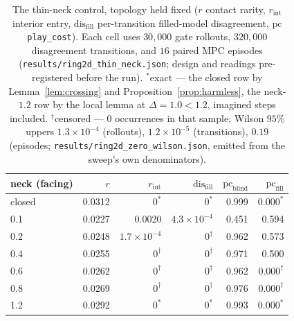 \documentclass[11pt]{article}
\theoremstyle{remark}
\begin{document}
\begin{table}[h]
\centering
\small
\begin{tabular}{lrrrrr}
\toprule
neck (facing) & $r$ & $r_{\mathrm{int}}$ & $\mathrm{dis}_{\mathrm{fill}}$ &
$\mathrm{pc}_{\mathrm{blind}}$ & $\mathrm{pc}_{\mathrm{fill}}$ \\
\midrule
closed & 0.0312 & $0^{\ast}$ & $0^{\ast}$ & 0.999 & $0.000^{\ast}$ \\
0.1 & 0.0227 & 0.0020 & $4.3\times10^{-4}$ & 0.451 & 0.594 \\
0.2 & 0.0248 & $1.7\times10^{-4}$ & $0^{\dagger}$ & 0.962 & 0.573 \\
0.4 & 0.0255 & $0^{\dagger}$ & $0^{\dagger}$ & 0.971 & 0.500 \\
0.6 & 0.0262 & $0^{\dagger}$ & $0^{\dagger}$ & 0.962 & $0.000^{\dagger}$ \\
0.8 & 0.0269 & $0^{\dagger}$ & $0^{\dagger}$ & 0.976 & $0.000^{\dagger}$ \\
1.2 & 0.0292 & $0^{\ast}$ & $0^{\ast}$ & 0.993 & $0.000^{\ast}$ \\
\bottomrule
\end{tabular}
\caption{The thin-neck control, topology held fixed ($r$ contact rarity,
$r_{\mathrm{int}}$ interior entry, $\mathrm{dis}_{\mathrm{fill}}$
per-transition filled-model disagreement, $\mathrm{pc}$
\texttt{play\_cost}). Each cell uses $30{,}000$ gate rollouts,
$320{,}000$ disagreement transitions, and $16$ paired MPC episodes
(\texttt{results/ring2d\_thin\_neck.json}; design and readings
pre-registered before the run). $^{\ast}$exact --- the
closed row by Lemma~\ref{lem:crossing} and
Proposition~\ref{prop:harmless}, the neck-$1.2$ row by the local lemma at
$\Delta = 1.0 < 1.2$, imagined steps included. $^{\dagger}$censored ---
$0$ occurrences in that sample; Wilson $95\%$ uppers $1.3\times10^{-4}$
(rollouts), $1.2\times10^{-5}$ (transitions), $0.19$ (episodes;
\texttt{results/ring2d\_zero\_wilson.json}, emitted from the sweep's own
denominators).}
\label{tab:thinneck}
\end{table}
\end{document}

